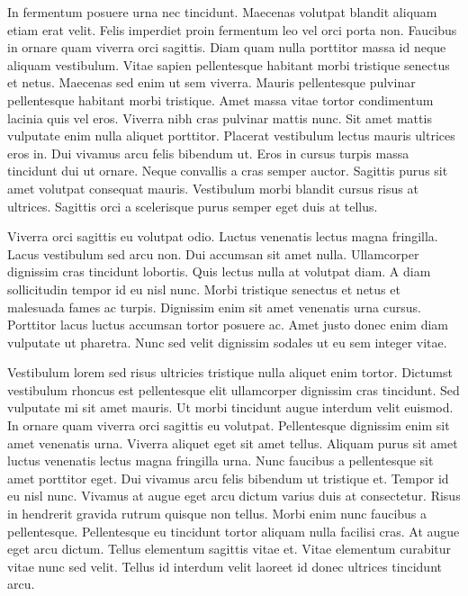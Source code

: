 \documentclass[11pt,a4paper]{article}
\begin{document}
In fermentum posuere urna nec tincidunt. Maecenas volutpat blandit aliquam etiam erat velit. Felis imperdiet proin fermentum leo vel orci porta non. Faucibus in ornare quam viverra orci sagittis. Diam quam nulla porttitor massa id neque aliquam vestibulum. Vitae sapien pellentesque habitant morbi tristique senectus et netus. Maecenas sed enim ut sem viverra. Mauris pellentesque pulvinar pellentesque habitant morbi tristique. Amet massa vitae tortor condimentum lacinia quis vel eros. Viverra nibh cras pulvinar mattis nunc. Sit amet mattis vulputate enim nulla aliquet porttitor. Placerat vestibulum lectus mauris ultrices eros in. Dui vivamus arcu felis bibendum ut. Eros in cursus turpis massa tincidunt dui ut ornare. Neque convallis a cras semper auctor. Sagittis purus sit amet volutpat consequat mauris. Vestibulum morbi blandit cursus risus at ultrices. Sagittis orci a scelerisque purus semper eget duis at tellus.

Viverra orci sagittis eu volutpat odio. Luctus venenatis lectus magna fringilla. Lacus vestibulum sed arcu non. Dui accumsan sit amet nulla. Ullamcorper dignissim cras tincidunt lobortis. Quis lectus nulla at volutpat diam. A diam sollicitudin tempor id eu nisl nunc. Morbi tristique senectus et netus et malesuada fames ac turpis. Dignissim enim sit amet venenatis urna cursus. Porttitor lacus luctus accumsan tortor posuere ac. Amet justo donec enim diam vulputate ut pharetra. Nunc sed velit dignissim sodales ut eu sem integer vitae.

Vestibulum lorem sed risus ultricies tristique nulla aliquet enim tortor. Dictumst vestibulum rhoncus est pellentesque elit ullamcorper dignissim cras tincidunt. Sed vulputate mi sit amet mauris. Ut morbi tincidunt augue interdum velit euismod. In ornare quam viverra orci sagittis eu volutpat. Pellentesque dignissim enim sit amet venenatis urna. Viverra aliquet eget sit amet tellus. Aliquam purus sit amet luctus venenatis lectus magna fringilla urna. Nunc faucibus a pellentesque sit amet porttitor eget. Dui vivamus arcu felis bibendum ut tristique et. Tempor id eu nisl nunc. Vivamus at augue eget arcu dictum varius duis at consectetur. Risus in hendrerit gravida rutrum quisque non tellus. Morbi enim nunc faucibus a pellentesque. Pellentesque eu tincidunt tortor aliquam nulla facilisi cras. At augue eget arcu dictum. Tellus elementum sagittis vitae et. Vitae elementum curabitur vitae nunc sed velit. Tellus id interdum velit laoreet id donec ultrices tincidunt arcu.
\end{document}
